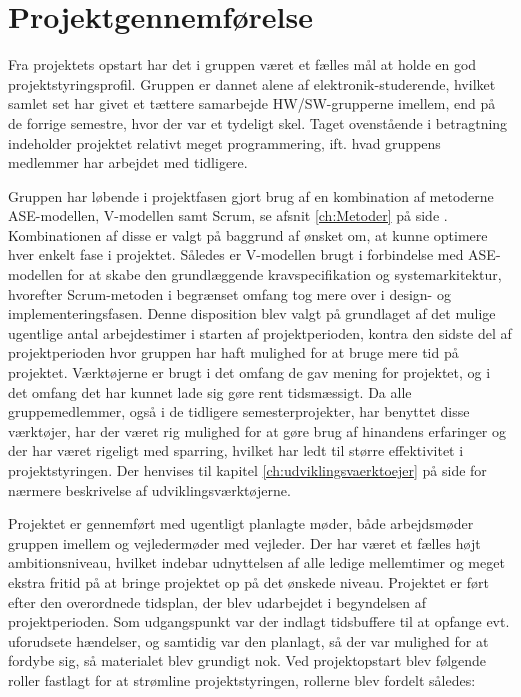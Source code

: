 \section{Projektgennemførelse} \label{ch:Projektgennemfoerelse}

Fra projektets opstart har det i gruppen været et fælles mål at holde en god projektstyringsprofil.  
Gruppen er dannet alene af elektronik-studerende, hvilket samlet set har givet et tættere samarbejde HW/SW-grupperne imellem, end på de forrige semestre, hvor der var et tydeligt skel. 
Taget ovenstående i betragtning indeholder projektet relativt meget programmering, ift. hvad gruppens medlemmer har arbejdet med tidligere.

Gruppen har løbende i projektfasen gjort brug af en kombination af metoderne ASE-modellen, V-modellen samt Scrum, se afsnit \ref{ch:Metoder}  på side \pageref{ch:Metoder}.
Kombinationen af disse er valgt på baggrund af ønsket om, at kunne optimere hver enkelt fase i projektet.
Således er V-modellen brugt i forbindelse med ASE-modellen for at skabe den grundlæggende kravspecifikation og systemarkitektur, hvorefter Scrum-metoden i begrænset omfang tog mere over i design- og implementeringsfasen. 
Denne disposition blev valgt på grundlaget af det mulige ugentlige antal arbejdestimer i starten af projektperioden, kontra den sidste del af projektperioden hvor gruppen har haft mulighed for at bruge mere tid på projektet.
Værktøjerne er brugt i det omfang de gav mening for projektet, og i det omfang det har kunnet lade sig gøre rent tidsmæssigt. 
Da alle gruppemedlemmer, også i de tidligere semesterprojekter, har benyttet disse værktøjer, har der været rig mulighed for at gøre brug af hinandens erfaringer og der har været rigeligt med sparring, hvilket har ledt til større effektivitet i projektstyringen. 
Der henvises til kapitel \ref{ch:udviklingsvaerktoejer}  på side \pageref{ch:udviklingsvaerktoejer} for nærmere beskrivelse af udviklingsværktøjerne.

Projektet er gennemført med ugentligt planlagte møder, både arbejdsmøder gruppen imellem og vejledermøder med vejleder. Der har været et fælles højt ambitionsniveau, hvilket indebar udnyttelsen af alle ledige mellemtimer og meget ekstra fritid på at bringe projektet op på det ønskede niveau. 
Projektet er ført efter den overordnede tidsplan, der blev udarbejdet i begyndelsen af projektperioden\cite{lib:Tidsplan}. Som udgangspunkt var der indlagt tidsbuffere til at opfange evt. uforudsete hændelser, og samtidig var den planlagt, så der var mulighed for at fordybe sig, så materialet blev grundigt nok.
Ved projektopstart blev følgende roller fastlagt for at strømline projektstyringen, rollerne blev fordelt således: 

